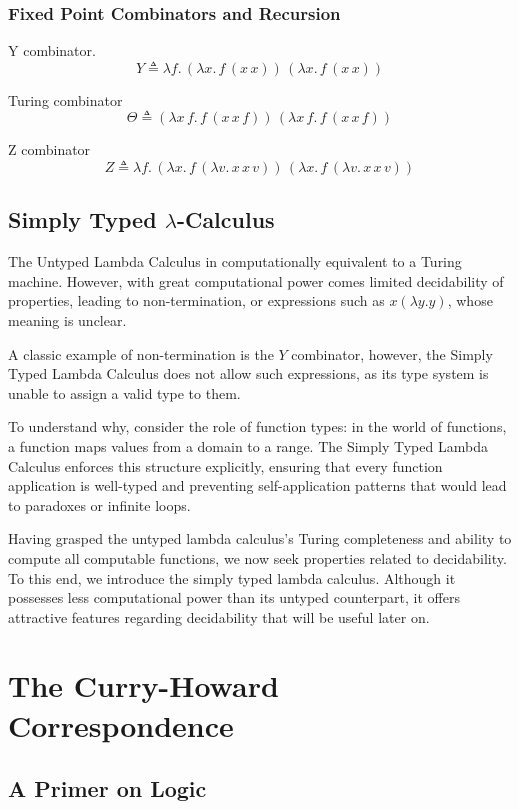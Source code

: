 \documentclass[12pt]{book}
\newcommand{\la}{\lambda}
\newcommand{\lCalc}{$\la$-Calculus}
\theoremstyle{plain}
\theoremstyle{definition}
\theoremstyle{definition}
\theoremstyle{definition}
\begin{document}
\subsection{\centering Fixed Point Combinators and Recursion}

Y combinator.
\[
Y \triangleq \lambda f.\, (\lambda x.\, f\, (x\, x))\, (\lambda x.\, f\, (x\, x))
\]

Turing combinator
\[
\Theta \triangleq 
(\lambda x\, f.\, f\, (x\, x\, f))\, (\lambda x\, f.\, f\, (x\, x\, f))
\]

Z combinator
\[
Z \triangleq \lambda f.\, 
  (\lambda x.\, f\, (\lambda v.\, x\, x\, v))\, 
  (\lambda x.\, f\, (\lambda v.\, x\, x\, v))
\]



\section{\centering Simply Typed \lCalc}

The Untyped Lambda Calculus in computationally equivalent to a  Turing machine. However, with great computational power comes limited decidability of properties, leading to non-termination, or expressions such as $x(\lambda y . y)$, whose meaning is unclear.

A classic example of non-termination is the $Y$ combinator, however, the Simply Typed Lambda Calculus does not allow such expressions, as its type system is unable to assign a valid type to them.

To understand why, consider the role of function types: in the world of functions, a function maps values from a domain to a range. The Simply Typed Lambda Calculus enforces this structure explicitly, ensuring that every function application is well-typed and preventing self-application patterns that would lead to paradoxes or infinite loops.

Having grasped the untyped lambda calculus's Turing completeness and ability to compute all computable functions, we now seek properties related to decidability. To this end, we introduce the simply typed lambda calculus. Although it possesses less computational power than its untyped counterpart, it offers attractive features regarding decidability that will be useful later on.


\chapter{The Curry-Howard Correspondence}


\section*{\centering A Primer on Logic}
\end{document}
